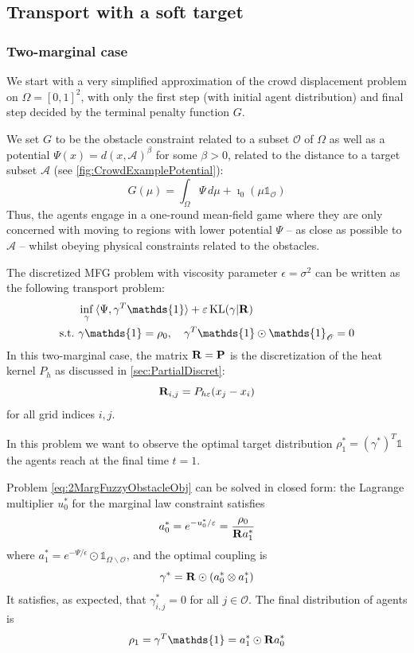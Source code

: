 \documentclass[../report.tex]{subfiles}
\begin{document}
\subsection{Transport with a soft target}

\subsubsection{Two-marginal case}

We start with a very simplified approximation of the crowd displacement problem on $\Omega = [0, 1]^2$, with only the first step (with initial agent distribution) and final step decided by the terminal penalty function $G$.

We set $G$ to be the obstacle constraint  related to a subset $\mathscr{O}$ of $\Omega$ as well as a potential $\Psi(x) = d(x, \mathscr A)^{\beta}$ for some $\beta > 0$, related to the distance to a target subset $\mathscr{A}$ (see \cref{fig:CrowdExamplePotential}):
\[
	G(\mu) = \int_\Omega \Psi\,d\mu + \imath_{0}(\mu\mathds{1}_{\mathscr O})
\]
Thus, the agents engage in a one-round mean-field game where they are only concerned with moving to regions with lower potential $\Psi$ -- as close as possible to $\mathscr{A}$ -- whilst obeying physical constraints related to the obstacles.

The discretized MFG problem with viscosity parameter $\epsilon = \sigma^2$ can be written as the following transport problem:
\begin{equation}\label{eq:2MargFuzzyObstacleObj}
\begin{aligned}
	&\inf_\gamma{} \langle \Psi, \gamma^T\mathds{1}\rangle + \epsilon \KL(\gamma | \bfR) \\
	\suchthat\ & \gamma\mathds{1} = \rho_0, \quad \gamma^T\mathds{1} \odot \mathds{1}_{\mathscr{O}} = 0
	\end{aligned}
\end{equation}
In this two-marginal case, the matrix $\mathbf{R} = \mathbf{P}$ is the discretization of the heat kernel $P_h$ as discussed in \cref{sec:PartialDiscret}:
\[
	\mathbf{R}_{i,j} = P_{h\varepsilon}(x_j - x_i)
\]
for all grid indices $i,j$.



In this problem we want to observe the optimal target distribution $\rho^*_1 = (\gamma^*)^T\mathds{1}$ the agents reach at the final time $t=1$.

\begin{prop}\label{thm:2MargFuzzyTarget}
Problem \eqref{eq:2MargFuzzyObstacleObj} can be solved in closed form: the Lagrange multiplier $u_0^*$ for the marginal law constraint satisfies
\[
	a_0^* = e^{-u_0^*/\varepsilon}  = \frac{\rho_0}{\mathbf{R} a^*_1}
\]
where $a^*_1 = e^{-\Psi/\epsilon}\odot\mathds{1}_{\Omega\backslash\mathscr{O}}$, and the optimal coupling is
\[
	\gamma^* = \mathbf{R}\odot (a_0^* \otimes a_1^*)	
\]
It satisfies, as expected, that $\gamma^*_{i,j} = 0$ for all $j\in\mathscr{O}$. The final distribution of agents is
\[
	\rho_1 = \gamma^T\mathds{1} = a_1^* \odot \bfR a_0^*
\]
\end{prop}
 
\end{document}
